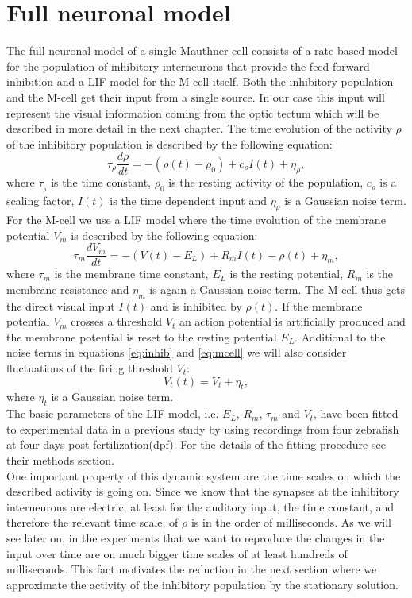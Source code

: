\documentclass[a4paper,10pt,hidelinks]{scrreprt}
\begin{document}
	\section{Full neuronal model}
	The full neuronal model of a single Mauthner cell consists of a rate-based model for the 
	population of inhibitory interneurons that provide the feed-forward inhibition and a LIF model 
	for the M-cell itself.
	Both the inhibitory population and the M-cell get their input from a single source.
	In our case this input will represent the visual information coming from the optic tectum which 
	will be described in more detail in the next chapter.
	The time evolution of the activity $\rho$ of the inhibitory population is described by the 
	following equation:
	\begin{equation}
	\tau _{\rho} \frac{d\rho}{dt} = - (\rho(t) - \rho_{0}) + c_{\rho} I(t) + 
	\eta _{\rho},
	\label{eq:inhib}
	\end{equation}
	where $\tau _{_\rho}$ is the time constant, $\rho _{0}$ is the resting activity of the 
	population, $c_{\rho}$ is a scaling factor, $I(t)$ is the time dependent input and $\eta 
	_{\rho}$ is a Gaussian noise term.
	For the M-cell we use a LIF model where the time evolution of the membrane potential $V_m$ is 
	described by the following equation:
	\begin{equation}
	\tau _m \frac{dV_m}{dt} = - (V(t) - E_{L}) + R_{m} I(t) - \rho (t) +  \eta 
	_m,
	\label{eq:mcell}
	\end{equation}
	where $\tau_{m}$ is the membrane time constant, $E_L$ is the resting potential, $R_m$ is the 
	membrane resistance and $\eta_{m}$ is again a Gaussian noise term.
	The M-cell thus gets the direct visual input $I(t)$ and is inhibited by $\rho(t)$.
	If the membrane potential $V_m$ crosses a threshold $V_t$ an action potential is artificially 
	produced and the membrane potential is reset to the resting potential $E_L$.
	Additional to the noise terms in equations \ref{eq:inhib} and \ref{eq:mcell} we will also 
	consider fluctuations of the firing threshold $V_t$:
	\begin{equation}
	V_t (t) = V_t + \eta_t,
	\label{eq:thrs}
	\end{equation}
	where $\eta_t$ is a Gaussian noise term.\\
	The basic parameters of the LIF model, i.e. $E_L$, $R_m$, $\tau_m$ and $V_t$, have been fitted 
	to experimental data in a previous study by \cite{Koyama2016} using recordings from four 
	zebrafish at four days post-fertilization(dpf).
	For the details of the fitting procedure see their methods section.\\
	One important property of this dynamic system are the time scales on which the described 
	activity is going on.
	Since we know that the synapses at the inhibitory interneurons are electric, at least for the 
	auditory input, the time constant, and therefore the relevant time scale, of $\rho$ is in the 
	order of milliseconds.
	As we will see later on, in the experiments that we want to reproduce the changes in the input 
	over time are on much bigger time scales of at least hundreds of milliseconds.
	This fact motivates the reduction in the next section where we approximate the activity of the 
	inhibitory population by the stationary solution.
\end{document}
